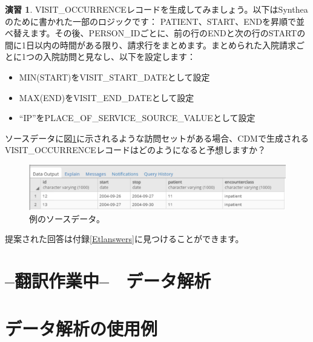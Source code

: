 \documentclass[
  11pt]{book}
\providecommand{\tightlist}{%
  \setlength{\itemsep}{0pt}\setlength{\parskip}{0pt}}
\theoremstyle{definition}
\theoremstyle{definition}
\theoremstyle{definition}
\newtheorem{exercise}{演習}[chapter]
\theoremstyle{definition}
\theoremstyle{remark}
\begin{document}
\begin{exercise}
\protect\hypertarget{exr:exerciseEtl3}{}\label{exr:exerciseEtl3}VISIT\_OCCURRENCEレコードを生成してみましょう。以下はSyntheaのために書かれた一部のロジックです：
PATIENT、START、ENDを昇順で並べ替えます。その後、PERSON\_IDごとに、前の行のENDと次の行のSTARTの間に1日以内の時間がある限り、請求行をまとめます。まとめられた入院請求ごとに1つの入院訪問と見なし、以下を設定します：

\begin{itemize}
\tightlist
\item
  MIN(START)をVISIT\_START\_DATEとして設定
\item
  MAX(END)をVISIT\_END\_DATEとして設定
\item
  ``IP''をPLACE\_OF\_SERVICE\_SOURCE\_VALUEとして設定
\end{itemize}

ソースデータに図\ref{fig:exerciseSourceData}に示されるような訪問セットがある場合、CDMで生成されるVISIT\_OCCURRENCEレコードはどのようになると予想しますか？
\end{exercise}

\begin{figure}

{\centering \includegraphics[width=1\linewidth]{images/ExtractTransformLoad/exerciseSourceData} 

}

\caption{例のソースデータ。}\label{fig:exerciseSourceData}
\end{figure}

提案された回答は付録\ref{Etlanswers}に見つけることができます。

\chapter*{--翻訳作業中--　データ解析}\label{ux7ffbux8a33ux4f5cux696dux4e2d-ux30c7ux30fcux30bfux89e3ux6790}

\chapter{データ解析の使用例}\label{DataAnalyticsUseCases}
\end{document}
